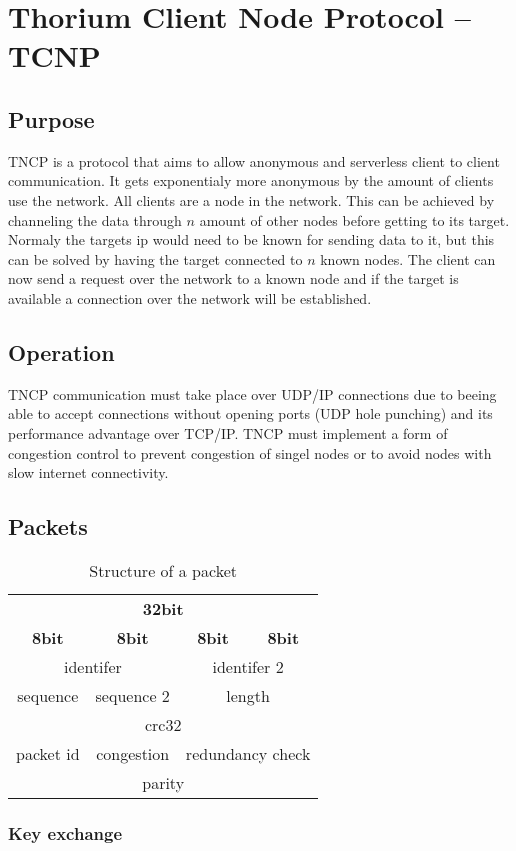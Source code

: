 \section{Thorium Client Node Protocol -- TCNP}
\subsection{Purpose}
TNCP is a protocol that aims to allow anonymous and serverless client to client communication. It gets exponentialy more anonymous by the amount of clients use the network. All clients are a node in the network.
This can be achieved by channeling the data through $ n $ amount of other nodes before getting to its target. Normaly the targets ip would need to be known for sending data to it, but this can be solved by having the target connected to $ n $ known nodes. The client can now send a request over the network to a known node and if the target is available a connection over the network will be established.
\subsection{Operation}
TNCP communication must take place over UDP/IP connections due to beeing able to accept connections without opening ports (UDP hole punching) and its performance advantage over TCP/IP.
TNCP must implement a form of congestion control to prevent congestion of singel nodes or to avoid nodes with slow internet connectivity.
\subsection{Packets}
\begin{table}[h!]
	\begin{center}
		\caption{Structure of a packet}
		\begin{tabular}{|c|c|c|c|}
			\multicolumn{4}{c}{\textbf{32bit}} \\ 
			\textbf{8bit} & \textbf{8bit} & \textbf{8bit} & \textbf{8bit} \\
			\multicolumn{2}{|c|}{identifer} & \multicolumn{2}{c|}{identifer 2} \\
			\hline
			sequence & sequence 2 & \multicolumn{2}{c|}{length} \\
			\hline
			\multicolumn{4}{|c|}{crc32} \\
			\hline
			packet id & congestion & \multicolumn{2}{c|}{redundancy check} \\
			\hline
			\multicolumn{4}{|c|}{parity} \\
		\end{tabular}
	\end{center}
\end{table}
\subsubsection{Key exchange}
